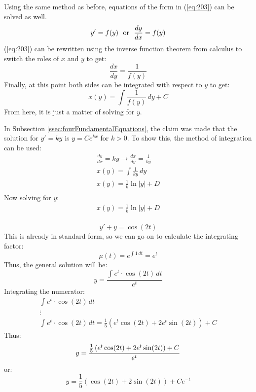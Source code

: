 \documentclass[12pt]{article}
\begin{document}
Using the same method as before, equations of the form in (\ref{eq:203}) can be solved as well.
\begin{equation}
  y' = f(y)\ \ \textup{or}\ \ \frac{dy}{dx} = f(y)
  \label{eq:203}
\end{equation}
(\ref{eq:203}) can be rewritten using the inverse function theorem from calculus to switch the roles of $x$ and $y$ to get:
\begin{equation*}
  \frac{dx}{dy} = \frac{1}{f(y)}
\end{equation*}
Finally, at this point both sides can be integrated with respect to $y$ to get:
\begin{equation*}
  x(y) = \int_{}^{} \frac{1}{f(y)} \,dy + C
\end{equation*}
From here, it is just a matter of solving for $y$.
\begin{example}
  In Subsection \ref{ssec:fourFundamentalEquations}, the claim was made that the solution for $y'=ky$ is $y=Ce^{kx}$ for $k>0$. To show this, the method of integration can be used:
  \begin{gather*}
    \frac{dy}{dx} = ky \rightarrow \frac{dx}{dy} = \frac{1}{ky} \\
    x(y) = \int_{}^{} \frac{1}{ky} \, dy \\
    x(y) = \frac{1}{k}\ln|y| + D \\
  \end{gather*}
  Now solving for $y$:
  \begin{gather*}
    x(y) = \frac{1}{k}\ln|y| + D \\
  \end{gather*}
\end{example}

\begin{example}
  \begin{equation*}
    y' + y = \cos(2t)
  \end{equation*}
  This is already in standard form, so we can go on to calculate the integrating factor:
  \begin{equation*}
    \mu(t) = e^{\int_{}^{} 1 \,dt} = e^t
  \end{equation*}
  Thus, the general solution will be:
  \begin{equation*}
    y = \frac{\int_{}^{} e^t \cdot \cos(2t) \,dt}{e^t}
  \end{equation*}
  Integrating the numerator:
  \begin{gather*}
    \int_{}^{} e^t \cdot \cos(2t) \,dt \\
    \vdots \\
    \int_{}^{} e^t \cdot \cos(2t) \,dt = \frac{1}{5}\left(e^t \cos(2t) + 2e^t \sin(2t)\right) + C
  \end{gather*}
  Thus:
  \begin{equation*}
    y = \frac{\frac{1}{5}\left(e^t \cos(2t) + 2e^t \sin(2t)\right) + C}{e^t} \\
  \end{equation*}
  or:
  \begin{equation*}
    y = \frac{1}{5}\left(\cos(2t) + 2\sin(2t)\right) + Ce^{-t}
  \end{equation*}
\end{example}
\end{document}
